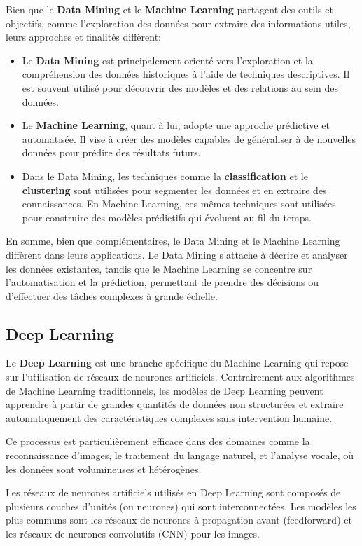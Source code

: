 Bien que le \textbf{Data Mining} et le \textbf{Machine Learning} partagent des outils et objectifs, comme l'exploration des données pour extraire des informations utiles, leurs approches et finalités diffèrent:
\begin{itemize}
    \item Le \textbf{Data Mining} est principalement orienté vers l'exploration et la compréhension des données historiques à l'aide de techniques descriptives. Il est souvent utilisé pour découvrir des modèles et des relations au sein des données.
    \item Le \textbf{Machine Learning}, quant à lui, adopte une approche prédictive et automatisée. Il vise à créer des modèles capables de généraliser à de nouvelles données pour prédire des résultats futurs.
    \item Dans le Data Mining, les techniques comme la \textbf{classification} et le \textbf{clustering} sont utilisées pour segmenter les données et en extraire des connaissances. En Machine Learning, ces mêmes techniques sont utilisées pour construire des modèles prédictifs qui évoluent au fil du temps.
\end{itemize}


En somme, bien que complémentaires, le Data Mining et le Machine Learning diffèrent dans leurs applications. Le Data Mining s'attache à décrire et analyser les données existantes, tandis que le Machine Learning se concentre sur l'automatisation et la prédiction, permettant de prendre des décisions ou d'effectuer des tâches complexes à grande échelle.

\subsection{Deep Learning}

Le \textbf{Deep Learning} est une branche spécifique du Machine Learning qui repose sur l'utilisation de réseaux de neurones artificiels. Contrairement aux algorithmes de Machine Learning traditionnels, les modèles de Deep Learning peuvent apprendre à partir de grandes quantités de données non structurées et extraire automatiquement des caractéristiques complexes sans intervention humaine. 

Ce processus est particulièrement efficace dans des domaines comme la reconnaissance d'images, le traitement du langage naturel, et l'analyse vocale, où les données sont volumineuses et hétérogènes.

Les réseaux de neurones artificiels utilisés en Deep Learning sont composés de plusieurs couches d'unités (ou neurones) qui sont interconnectées. Les modèles les plus communs sont les réseaux de neurones à propagation avant (feedforward) et les réseaux de neurones convolutifs (CNN) pour les images.

